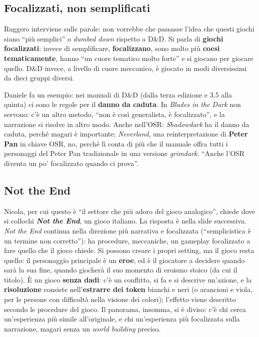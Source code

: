\subsection{Focalizzati, non semplificati}

Ruggero interviene sulle parole: non vorrebbe che passasse l'idea che questi
giochi siano ``più semplici'' o \emph{dumbed down} rispetto a D\&D. Si parla di
\textbf{giochi focalizzati}: invece di semplificare, \textbf{focalizzano}, sono
molto più \textbf{coesi tematicamente}, hanno ``un cuore tematico molto forte'' e
si giocano per giocare quello. D\&D invece, a livello di cuore meccanico, è
giocato in modi diversissimi da dieci gruppi diversi.

Daniele fa un esempio: nei manuali di D\&D (dalla terza edizione e 3.5 alla
quinta) ci sono le regole per il \textbf{danno da caduta}. In \emph{Blades in
the Dark} non servono: c'è un altro metodo, ``non è così generalista, è
focalizzato'', e la narrazione si risolve in altro modo. Anche nell'OSR:
\emph{Shadowdark} ha il danno da caduta, perché magari è importante;
\emph{Neverland}, una reinterpretazione di \textbf{Peter Pan} in chiave OSR, no,
perché lì conta di più che il manuale offra tutti i personaggi del Peter Pan
tradizionale in una versione \emph{grimdark}. ``Anche l'OSR diventa un po'
focalizzato quando ci prova''.

\subsection{Not the End}



Nicola, per cui questo è ``il settore che più adoro del gioco analogico'',
chiede dove si collochi \textbf{\emph{Not the End}}, un gioco italiano. La
risposta è nella slide successiva. \emph{Not the End} continua nella direzione
più narrativa e focalizzata (``semplicistica è un termine non corretto''): ha
procedure, meccaniche, un gameplay focalizzato a fare quello che il gioco
chiede. Si possono creare i propri setting, ma il gioco resta quello: il
personaggio principale è un \textbf{eroe}, ed è il giocatore a decidere quando
sarà la sua fine, quando giocherà il suo momento di eroismo stoico (da cui il
titolo). È un gioco \textbf{senza dadi}: c'è un conflitto, si fa e si descrive
un'azione, e la \textbf{risoluzione} consiste nell'\textbf{estrarre dei token}
bianchi e neri (o arancioni e viola, per le persone con difficoltà nella visione
dei colori); l'effetto viene descritto secondo le procedure del gioco. Il
panorama, insomma, si è diviso: c'è chi cerca un'esperienza più simile
all'originale, e chi un'esperienza più focalizzata sulla narrazione, magari
senza un \emph{world building} preciso.

